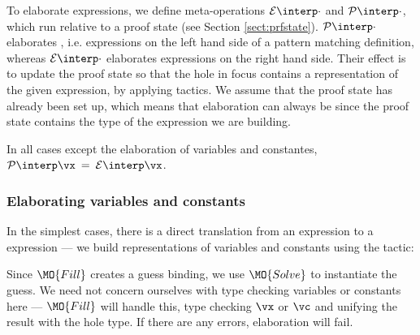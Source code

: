 

To elaborate expressions, we define meta-operations $\ttinterp{\cdot}$ and
$\ttpinterp{\cdot}$, which run relative to a proof state (see Section
\ref{sect:prfstate}). $\ttpinterp{\cdot}$ elaborates , i.e.
expressions on the left hand side of a pattern matching definition, whereas
$\ttinterp{\cdot}$ elaborates expressions on the right hand side.
Their effect is
to update the proof state so that the hole in focus contains a representation
of the given expression, by applying tactics. We assume that the proof state
has already been set up, which means that elaboration can always be
 since the proof state contains the type of the expression we
are building.

In all cases except the elaboration of variables and constantes, 
$\ttpinterp{\vx}\:=\:\ttinterp{\vx}$.

\subsubsection{Elaborating variables and constants}

In the simplest cases, there is a direct translation from an \IdrisM{} expression to
a \TT{} expression --- we build \TT{} representations of variables and constants using
the  tactic:


Since $\MO{Fill}$ creates a guess binding, we use $\MO{Solve}$ to instantiate
the guess.  We need not concern ourselves with type checking variables or
constants here --- $\MO{Fill}$ will handle this, type checking $\vx$ or $\vc$
and unifying the result with the hole type. If there are any errors,
elaboration will fail.

